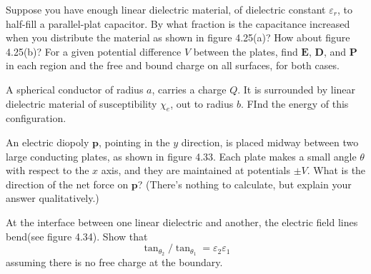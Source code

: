 \documentclass{homework}
\newcommand\ve{\varepsilon}
\newcommand{\bs}[1]{\ensuremath{\boldsymbol{#1}}}
\begin{document}
\begin{homeworkProblem}[Problem 4.19]

  Suppose you have enough linear dielectric material, of dielectric constant $\ve_r$, to half-fill a parallel-plat capacitor. By what fraction is the capacitance increased when you distribute the material as shown in figure 4.25(a)? How about figure 4.25(b)? For a given potential difference $V$ between the plates, find \bs{E}, \bs{D}, and \bs{P} in each region and the free and bound charge on all surfaces, for both cases.

  \vspace{.2in}

  \problemAnswer{ %
  }
\end{homeworkProblem}

\begin{homeworkProblem}[Problem 4.26]

  A spherical conductor of radius $a$, carries a charge $Q$. It is surrounded by linear dielectric material of susceptibility $\chi_e$, out to radius $b$. FInd the energy of this configuration.

  \vspace{.2in}

  \problemAnswer{ %
  }
\end{homeworkProblem}

\begin{homeworkProblem}[Problem 4.30]

  An electric diopoly \bs{p}, pointing in the $y$ direction, is placed midway between two large conducting plates, as shown in figure 4.33. Each plate makes a small angle $\theta$ with respect to the $x$ axis, and they are maintained at potentials $\pm V$. What is the direction of the net force on \bs{p}? (There's nothing to calculate, but explain your answer qualitatively.)

  \vspace{.2in}

  \problemAnswer{ %
  }
\end{homeworkProblem}

\begin{homeworkProblem}[Problem 4.36]

  At the interface between one linear dielectric and another, the electric field lines bend(see figure 4.34). Show that $$\tan_{\theta_2} / \tan_{\theta_1} = \ve_2 \ve_1$$ assuming there is no free charge at the boundary.

  \vspace{.2in}

  \problemAnswer{ %
  }
\end{homeworkProblem}
\end{document}
